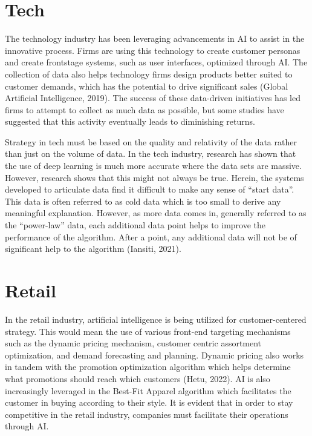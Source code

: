 \documentclass[
]{book}
\begin{document}
\hypertarget{tech-1}{%
\section{Tech}\label{tech-1}}

The technology industry has been leveraging advancements in AI to assist in the innovative process. Firms are using this technology to create customer personas and create frontstage systems, such as user interfaces, optimized through AI. The collection of data also helps technology firms design products better suited to customer demands, which has the potential to drive significant sales (Global Artificial Intelligence, 2019). The success of these data-driven initiatives has led firms to attempt to collect as much data as possible, but some studies have suggested that this activity eventually leads to diminishing returns.

Strategy in tech must be based on the quality and relativity of the data rather than just on the volume of data. In the tech industry, research has shown that the use of deep learning is much more accurate where the data sets are massive. However, research shows that this might not always be true. Herein, the systems developed to articulate data find it difficult to make any sense of ``start data''. This data is often referred to as cold data which is too small to derive any meaningful explanation. However, as more data comes in, generally referred to as the ``power-law'' data, each additional data point helps to improve the performance of the algorithm. After a point, any additional data will not be of significant help to the algorithm (Iansiti, 2021).

\hypertarget{retail-1}{%
\section{Retail}\label{retail-1}}

In the retail industry, artificial intelligence is being utilized for customer-centered strategy. This would mean the use of various front-end targeting mechanisms such as the dynamic pricing mechanism, customer centric assortment optimization, and demand forecasting and planning. Dynamic pricing also works in tandem with the promotion optimization algorithm which helps determine what promotions should reach which customers (Hetu, 2022). AI is also increasingly leveraged in the Best-Fit Apparel algorithm which facilitates the customer in buying according to their style. It is evident that in order to stay competitive in the retail industry, companies must facilitate their operations through AI.
\end{document}
